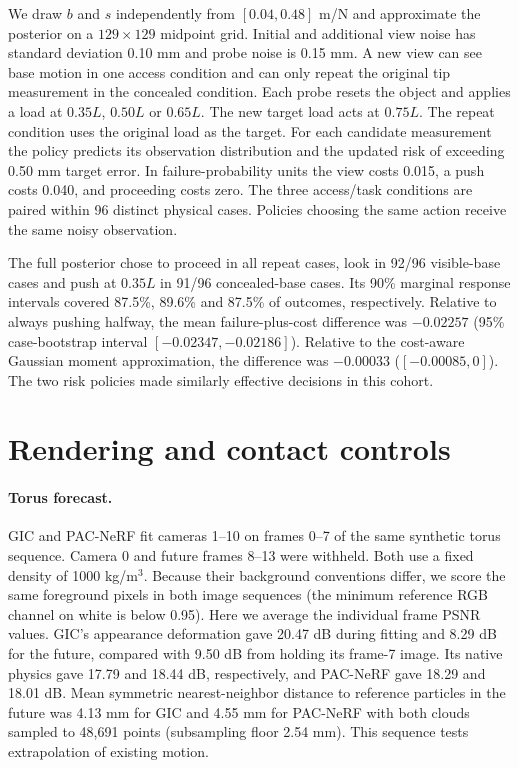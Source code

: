 We draw $b$ and $s$ independently from $[0.04,0.48]$ m/N and approximate the posterior on a $129\times129$ midpoint grid. Initial and additional view noise has standard deviation 0.10 mm and probe noise is 0.15 mm. A new view can see base motion in one access condition and can only repeat the original tip measurement in the concealed condition. Each probe resets the object and applies a load at $0.35L$, $0.50L$ or $0.65L$. The new target load acts at $0.75L$. The repeat condition uses the original load as the target. For each candidate measurement the policy predicts its observation distribution and the updated risk of exceeding 0.50 mm target error. In failure-probability units the view costs 0.015, a push costs 0.040, and proceeding costs zero. The three access/task conditions are paired within 96 distinct physical cases. Policies choosing the same action receive the same noisy observation.

The full posterior chose to proceed in all repeat cases, look in 92/96 visible-base cases and push at $0.35L$ in 91/96 concealed-base cases. Its 90\% marginal response intervals covered 87.5\%, 89.6\% and 87.5\% of outcomes, respectively. Relative to always pushing halfway, the mean failure-plus-cost difference was $-0.02257$ (95\% case-bootstrap interval $[-0.02347,-0.02186]$). Relative to the cost-aware Gaussian moment approximation, the difference was $-0.00033$ ($[-0.00085,0]$). The two risk policies made similarly effective decisions in this cohort.

\section{Rendering and contact controls}
\paragraph{Torus forecast.}
GIC and PAC-NeRF fit cameras 1--10 on frames 0--7 of the same synthetic torus sequence. Camera 0 and future frames 8--13 were withheld. Both use a fixed density of 1000 kg/m$^3$. Because their background conventions differ, we score the same foreground pixels in both image sequences (the minimum reference RGB channel on white is below 0.95). Here we average the individual frame PSNR values. GIC's appearance deformation gave 20.47 dB during fitting and 8.29 dB for the future, compared with 9.50 dB from holding its frame-7 image. Its native physics gave 17.79 and 18.44 dB, respectively, and PAC-NeRF gave 18.29 and 18.01 dB. Mean symmetric nearest-neighbor distance to reference particles in the future was 4.13 mm for GIC and 4.55 mm for PAC-NeRF with both clouds sampled to 48,691 points (subsampling floor 2.54 mm). This sequence tests extrapolation of existing motion.

